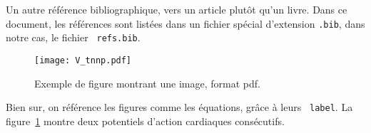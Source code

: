 \documentclass[12pt,twoside]{report}
\begin{document}
Un autre référence bibliographique, vers un article \cite{rush_larsen.1978}
plutôt qu'un livre. Dans ce document, les références sont listées dans un
fichier spécial d'extension {\tt .bib}, dans notre cas, le fichier {\tt
  refs.bib}.
\begin{figure}[htpb!]
  \centering
  \texttt{[image: V\_tnnp.pdf]}
  \caption{Exemple de figure montrant une image, format pdf.}
  \label{fig:exemple}
\end{figure}

Bien sur, on référence les figures comme les équations, grâce à leurs {\tt
  label}. La figure~\ref{fig:exemple} montre deux potentiels d'action cardiaques
consécutifs.

\cleardoublepage


\end{document}
